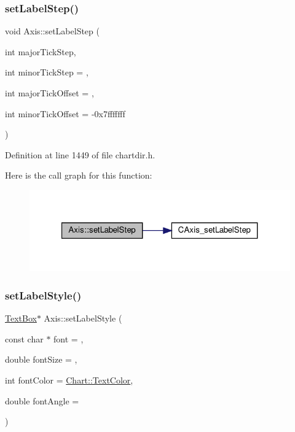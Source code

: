 \subsubsection{\texorpdfstring{set\+Label\+Step()}{setLabelStep()}}
{\footnotesize\ttfamily void Axis\+::set\+Label\+Step (\begin{DoxyParamCaption}\item[{int}]{major\+Tick\+Step,  }\item[{int}]{minor\+Tick\+Step = {},  }\item[{int}]{major\+Tick\+Offset = {},  }\item[{int}]{minor\+Tick\+Offset = {\ttfamily -\/0x7fffffff} }\end{DoxyParamCaption})\hspace{0.3cm}{\ttfamily [inline]}}



Definition at line 1449 of file chartdir.\+h.

Here is the call graph for this function\+:
\nopagebreak
\begin{figure}[H]
\begin{center}
\leavevmode
\includegraphics[width=321pt]{class_axis_a111155ffdce1d11e8896e5f185a7b753_cgraph}
\end{center}
\end{figure}
\mbox{\label{class_axis_ab524e166c981420e6de22979fd695bb6}} 
\subsubsection{\texorpdfstring{set\+Label\+Style()}{setLabelStyle()}}
{\footnotesize\ttfamily \hyperlink{class_text_box}{Text\+Box}$\ast$ Axis\+::set\+Label\+Style (\begin{DoxyParamCaption}\item[{const char $\ast$}]{font = {},  }\item[{double}]{font\+Size = {},  }\item[{int}]{font\+Color = {\ttfamily \hyperlink{namespace_chart_abee0d882fdc9ad0b001245ad9fc64011a879e14f2f5024caccc047374342321ef}{Chart\+::\+Text\+Color}},  }\item[{double}]{font\+Angle = {} }\end{DoxyParamCaption})\hspace{0.3cm}{\ttfamily [inline]}}



